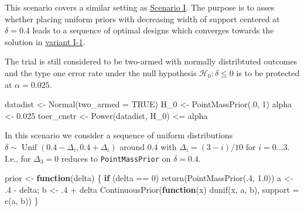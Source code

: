 \documentclass[
]{book}
\newenvironment{Shaded}{\begin{snugshade}}{\end{snugshade}}
\newcommand{\AttributeTok}[1]{\textcolor[rgb]{0.77,0.63,0.00}{#1}}
\newcommand{\ConstantTok}[1]{\textcolor[rgb]{0.00,0.00,0.00}{#1}}
\newcommand{\ControlFlowTok}[1]{\textcolor[rgb]{0.13,0.29,0.53}{\textbf{#1}}}
\newcommand{\DecValTok}[1]{\textcolor[rgb]{0.00,0.00,0.81}{#1}}
\newcommand{\FloatTok}[1]{\textcolor[rgb]{0.00,0.00,0.81}{#1}}
\newcommand{\FunctionTok}[1]{\textcolor[rgb]{0.00,0.00,0.00}{#1}}
\newcommand{\NormalTok}[1]{#1}
\newcommand{\OtherTok}[1]{\textcolor[rgb]{0.56,0.35,0.01}{#1}}
\newcommand{\SpecialCharTok}[1]{\textcolor[rgb]{0.00,0.00,0.00}{#1}}
\begin{document}
This scenario covers a similar setting as \protect\hyperlink{scenarioI}{Scenario I}.
The purpose is to asses whether placing uniform priors with decreasing
width of support centered at \(\delta=0.4\) leads to a sequence of
optimal designs which converges towards the solution in \protect\hyperlink{variantI.1}{variant I-1}.

The trial is still considered to be two-armed with normally distribtuted outcomes
and the type one error rate under the null hypothesis
\(\mathcal{H}_0:\delta \leq 0\) is to be protected at \(\alpha = 0.025\).

\begin{Shaded}
\begin{Highlighting}[]
\NormalTok{datadist   }\OtherTok{\textless{}{-}} \FunctionTok{Normal}\NormalTok{(}\AttributeTok{two\_armed =} \ConstantTok{TRUE}\NormalTok{)}
\NormalTok{H\_0        }\OtherTok{\textless{}{-}} \FunctionTok{PointMassPrior}\NormalTok{(.}\DecValTok{0}\NormalTok{, }\DecValTok{1}\NormalTok{)}
\NormalTok{alpha      }\OtherTok{\textless{}{-}} \FloatTok{0.025}
\NormalTok{toer\_cnstr }\OtherTok{\textless{}{-}} \FunctionTok{Power}\NormalTok{(datadist, H\_0) }\SpecialCharTok{\textless{}=}\NormalTok{ alpha}
\end{Highlighting}
\end{Shaded}

In this scenario we consider a sequence of uniform distributions
\(\delta\sim\operatorname{Unif}(0.4 - \Delta_i, 0.4 + \Delta_i)\)
around \(0.4\) with \(\Delta_i=(3 - i)/10\) for \(i=0\ldots 3\).
I.e., for \(\Delta_3=0\) reduces to \texttt{PointMassPrior} on \(\delta=0.4\).

\begin{Shaded}
\begin{Highlighting}[]
\NormalTok{prior }\OtherTok{\textless{}{-}} \ControlFlowTok{function}\NormalTok{(delta) \{}
    \ControlFlowTok{if}\NormalTok{ (delta }\SpecialCharTok{==} \DecValTok{0}\NormalTok{)}
        \FunctionTok{return}\NormalTok{(}\FunctionTok{PointMassPrior}\NormalTok{(.}\DecValTok{4}\NormalTok{, }\FloatTok{1.0}\NormalTok{))}
\NormalTok{    a }\OtherTok{\textless{}{-}}\NormalTok{ .}\DecValTok{4} \SpecialCharTok{{-}}\NormalTok{ delta; b }\OtherTok{\textless{}{-}}\NormalTok{ .}\DecValTok{4} \SpecialCharTok{+}\NormalTok{ delta}
    \FunctionTok{ContinuousPrior}\NormalTok{(}\ControlFlowTok{function}\NormalTok{(x) }\FunctionTok{dunif}\NormalTok{(x, a, b), }\AttributeTok{support =} \FunctionTok{c}\NormalTok{(a, b))}
\NormalTok{\}}
\end{Highlighting}
\end{Shaded}
\end{document}
